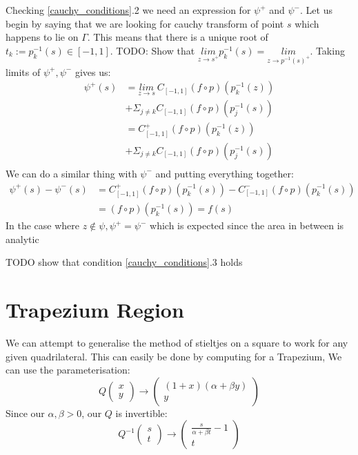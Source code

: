 \documentclass{article}
\begin{document}
Checking \eqref{cauchy_conditions}.2 we need an expression for $\psi^+$ and $\psi^-$.
Let us begin by saying that we are looking for cauchy transform of point $s$ which happens to lie on $\Gamma$.
This means that there is a unique root of $t_k := p_k^{-1}(s) \in [-1,1]$.
TODO: Show that $\underset{z\to s^+}{lim} p_k^{-1}(s) =\underset{z\to p^{-1}(s)^+}{lim}$.
Taking limits of $\psi^+, \psi^-$ gives us:
\begin{equation}\begin{split}
\psi^+(s)&=\underset{z\to s}{lim}\:C_{[-1,1]}(f\circ p)(p_k^{-1}(z)) \\
&+\Sigma_{j\neq k}C_{[-1,1]}(f\circ p)(p_j^{-1}(s)) \\
&=C^+_{[-1,1]}(f\circ p)(p_k^{-1}(z)) \\
&+\Sigma_{j\neq k}C_{[-1,1]}(f\circ p)(p_j^{-1}(s)) \\
\end{split}\end{equation}
We can do a similar thing with $\psi^-$ and putting everything together:
\begin{equation}\begin{split}
\psi^+(s)-\psi^-(s)&=C_{[-1,1]}^+(f\circ p)(p_k^{-1}(s))-C_{[-1,1]}^-(f\circ p)(p_k^{-1}(s)) \\
&= (f\circ p)(p_k^{-1}(s)) = f(s)
\end{split}\end{equation}
In the case where $z \notin \psi, \psi^+=\psi^-$ which is expected since the area in between is analytic

TODO show that condition \eqref{cauchy_conditions}.3 holds

\section{Trapezium Region}
We can attempt to generalise the method of stieltjes on a square to work for any given quadrilateral.
This can easily be done by computing for a Trapezium,
We can use the parameterisation: $$Q\begin{pmatrix}x\\y\end{pmatrix}\rightarrow
\begin{pmatrix}(1+x)(\alpha+\beta y)\\y\end{pmatrix}$$
Since our $\alpha, \beta > 0$, our $Q$ is invertible:
$$Q^{-1}\begin{pmatrix}s\\t\end{pmatrix}\rightarrow\begin{pmatrix}\frac{s}{\alpha+\beta t}-1\\t\end{pmatrix}$$
\end{document}

